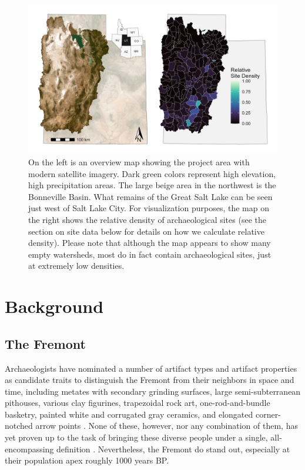 \documentclass[
  number,
  preprint,
  3p]{elsarticle}
\begin{document}
\begin{figure}

{\centering \includegraphics[width=6in,height=\textheight]{../figures/overview.png}

}

\caption{\label{fig-overview}On the left is an overview map showing the
project area with modern satellite imagery. Dark green colors represent
high elevation, high precipitation areas. The large beige area in the
northwest is the Bonneville Basin. What remains of the Great Salt Lake
can be seen just west of Salt Lake City. For visualization purposes, the
map on the right shows the relative density of archaeological sites (see
the section on site data below for details on how we calculate relative
density). Please note that although the map appears to show many empty
watersheds, most do in fact contain archaeological sites, just at
extremely low densities.}

\end{figure}

\hypertarget{background}{%
\section{Background}\label{background}}

\hypertarget{the-fremont}{%
\subsection{The Fremont}\label{the-fremont}}

Archaeologists have nominated a number of artifact types and artifact
properties as candidate traits to distinguish the Fremont from their
neighbors in space and time, including metates with secondary grinding
surfaces, large semi-subterranean pithouses, various clay figurines,
trapezoidal rock art, one-rod-and-bundle basketry, painted white and
corrugated gray ceramics, and elongated corner-notched arrow points
\citep{madsen1998}. None of these, however, nor any combination of them,
has yet proven up to the task of bringing these diverse people under a
single, all-encompassing definition \citep{madsen1998}. Nevertheless,
the Fremont do stand out, especially at their population apex roughly
1000 years BP.
\end{document}
